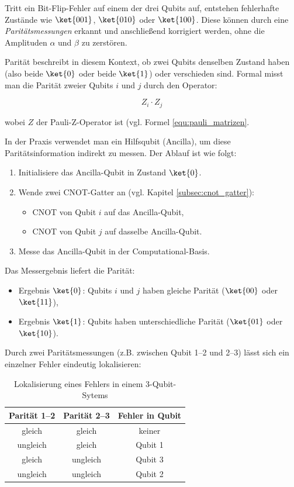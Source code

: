 Tritt ein Bit-Flip-Fehler auf einem der drei Qubits auf, entstehen fehlerhafte Zustände wie $\ket{001}$, $\ket{010}$ oder $\ket{100}$. Diese können durch eine \emph{Paritätsmessungen} erkannt und anschließend korrigiert werden, ohne die Amplituden $\alpha$ und $\beta$ zu zerstören.

Parität beschreibt in diesem Kontext, ob zwei Qubits denselben Zustand haben (also beide $\ket{0}$ oder beide $\ket{1}$) oder verschieden sind. Formal misst man die Parität zweier Qubits $i$ und $j$ durch den Operator:

\begin{equation}
 Z_i \cdot Z_j   
 \label{equ:parität_qubits}
\end{equation}


wobei $Z$ der Pauli-Z-Operator ist (vgl. Formel \ref{equ:pauli_matrizen}.

In der Praxis verwendet man ein Hilfsqubit (Ancilla), um diese Paritätsinformation indirekt zu messen. Der Ablauf ist wie folgt:

\begin{enumerate}
    \item Initialisiere das Ancilla-Qubit in Zustand $\ket{0}$.
    \item Wende zwei CNOT-Gatter an (vgl. Kapitel \ref{subsec:cnot_gatter}): 
    \begin{itemize}
        \item CNOT von Qubit $i$ auf das Ancilla-Qubit,
        \item CNOT von Qubit $j$ auf dasselbe Ancilla-Qubit.
    \end{itemize}
    \item Messe das Ancilla-Qubit in der Computational-Basis.
\end{enumerate}

Das Messergebnis liefert die Parität:
\begin{itemize}
    \item Ergebnis $\ket{0}$: Qubits $i$ und $j$ haben gleiche Parität ($\ket{00}$ oder $\ket{11}$),
    \item Ergebnis $\ket{1}$: Qubits haben unterschiedliche Parität ($\ket{01}$ oder $\ket{10}$).
\end{itemize}

Durch zwei Paritätsmessungen (z.B. zwischen Qubit 1–2 und 2–3) lässt sich ein einzelner Fehler eindeutig lokalisieren:

\begin{table}[h]
    \centering
\begin{tabular}{|c|c|c|}
\hline
Parität 1–2 & Parität 2–3 & Fehler in Qubit \\
\hline
gleich      & gleich      & keiner \\
ungleich    & gleich      & Qubit 1 \\
gleich      & ungleich    & Qubit 3 \\
ungleich    & ungleich    & Qubit 2 \\
\hline
\end{tabular}
   \label{tab:felherkorrektur}
\caption{Lokalisierung eines Fehlers in einem 3-Qubit-Sytems}
\end{table}


